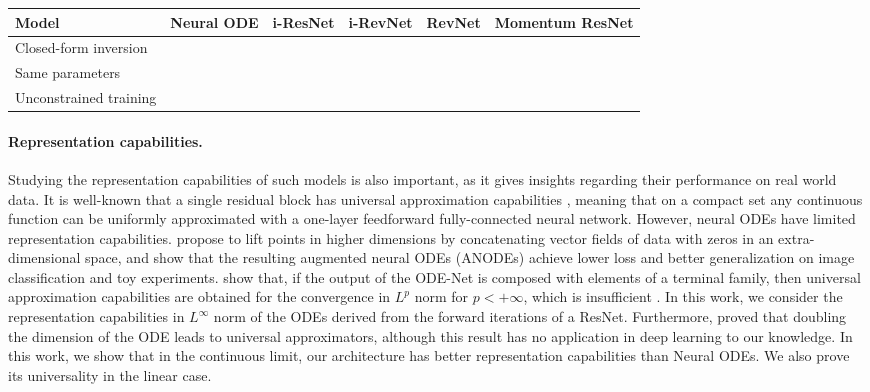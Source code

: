 \documentclass{article}
\newcommand{\cmark}{\ding{51}}\newcommand{\xmark}{\ding{55}}\setlength{\intextsep}{10pt plus 2pt minus 2pt}
\begin{document}
\vspace{-0.5em}
\begin{table*}[h!]
    \centering
    \begin{tabular}{ |p{4cm}|p{2cm}|p{2cm}|p{2cm}|p{2cm}|p{2cm}|}
     \hline
\textbf{Model} & Neural ODE &  i-ResNet & i-RevNet & RevNet & Momentum ResNet\\
 \hline
   Closed-form inversion & \cmark &  \xmark & \cmark & \cmark & \cmark \\
   \hline
 Same parameters  & \xmark &  \cmark & \xmark & \xmark & \cmark \\
 \hline
 Unconstrained training & \cmark &  \xmark & \cmark & \cmark & \cmark \\ 
 \hline
\end{tabular}
\caption{\label{tab:comparison_invertible_architectures} {\bf Comparison of reversible residual architectures} }
\end{table*}
 \fi 

\vspace{-0.5em}
 \paragraph{Representation capabilities.}

Studying the representation capabilities of such models is also important, as it gives insights regarding their performance on real world data. It is well-known that a single residual block has universal approximation capabilities \citep{Cybenkot2006ApproximationBS}, meaning that on a compact set any continuous function can be uniformly approximated with a one-layer feedforward fully-connected neural network. However, neural ODEs have limited representation capabilities. 
\citet{dupont2019augmented} propose to lift points in higher dimensions by concatenating vector fields of data with zeros in an extra-dimensional space, and show that the resulting augmented neural ODEs (ANODEs) achieve lower loss and better generalization on image classification and toy experiments.  \citet{li2019deep} show that, if the output of the ODE-Net is composed with elements of a terminal family, then universal approximation capabilities are obtained for the convergence in $L^p$ norm for $p<+ \infty$, which is insufficient \citep{teshima2020universal}. In this work, we consider the representation capabilities in $L^{\infty}$ norm of the ODEs derived from the forward iterations of a ResNet.  Furthermore, \citet{zhang2019approximation} proved that doubling the dimension of the ODE leads to universal approximators, although this result has no application in deep learning to our knowledge.  In this work, we show that in the continuous limit, our architecture has better representation capabilities than Neural ODEs. We also prove its universality in the linear case.
\vspace{-0.5em}
\end{document}
